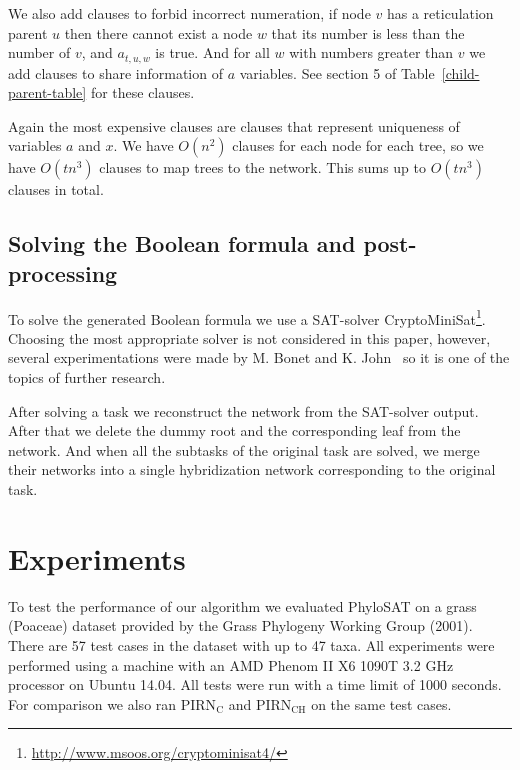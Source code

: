 \documentclass[runningheads, envcountsame, a4paper]{llncs}
\begin{document}
We also add clauses to forbid incorrect numeration, if node $v$ has a reticulation parent $u$ then there cannot 
exist a node $w$ that its number is less than the number of $v$, and $a_{t,u,w}$ is true. And for all $w$ with numbers 
greater than $v$ we add clauses to share information of $a$ variables. See section 5 of Table~\ref{child-parent-table} for these clauses.

Again the most expensive clauses are clauses that represent uniqueness of variables $a$ and $x$. We have $O(n^2)$ clauses for
each node for each tree, so we have $O(tn^3)$ clauses to map trees to the network. This sums up to $O(tn^3)$ clauses in total.

\subsection{Solving the Boolean formula and post-processing}

To solve the generated Boolean formula we use a SAT-solver CryptoMiniSat\footnote{\url{http://www.msoos.org/cryptominisat4/}}.
Choosing the most appropriate solver is not considered in this paper, however, several experimentations were made by 
M. Bonet and K. John~\cite{bonet2009efficiently} so it is one of the topics of further research.

After solving a task we reconstruct the network from the SAT-solver output. After that we delete the dummy root and the corresponding 
leaf from the network. And when all the subtasks of the original task are solved, we merge their networks into a single 
hybridization network corresponding to the original task.

\section{Experiments}

To test the performance of our algorithm we evaluated PhyloSAT on a grass (Poaceae) dataset provided by the Grass Phylogeny Working Group (2001). There are 57 test cases in the dataset with up to 47 taxa. All experiments were performed using a machine with an AMD Phenom II X6 1090T 3.2 GHz 
processor on Ubuntu 14.04. All tests were run with a time limit of 1000 seconds. For comparison we also ran PIRN$\mathrm{_C}$ and PIRN$\mathrm{_{CH}}$ 
on the same test cases. 
\end{document}
